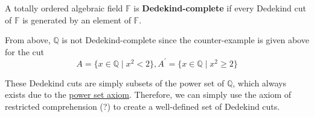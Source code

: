   \begin{definition}
    A totally ordered algebraic field $\mathbb{F}$ is \textbf{Dedekind-complete} if every Dedekind cut of $\mathbb{F}$ is generated by an element of $\mathbb{F}$. 
  \end{definition}

  From above, $\mathbb{Q}$ is not Dedekind-complete since the counter-example is given above for the cut 
  \begin{equation}
    A = \{x \in \mathbb{Q} \mid x^2 < 2 \}, A^\prime = \{x \in \mathbb{Q} \mid x^2 \geq 2 \}
  \end{equation}

  These Dedekind cuts are simply subsets of the power set of $\mathbb{Q}$, which always exists due to the \hyperref[st-power-set-axiom]{power set axiom}. Therefore, we can simply use the axiom of restricted comprehension (?) to create a well-defined set of Dedekind cuts.    

